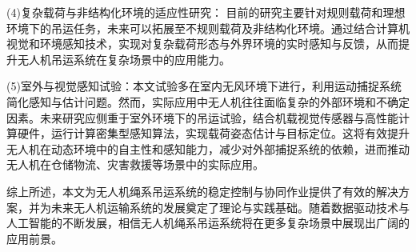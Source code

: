 \documentclass[lang=chs, degree=master, blindreview=true, winfonts=true]{yanputhesis}
\begin{document}
(4)复杂载荷与非结构化环境的适应性研究：
目前的研究主要针对规则载荷和理想环境下的吊运任务，未来可以拓展至不规则载荷及非结构化环境。通过结合计算机视觉和环境感知技术，实现对复杂载荷形态与外界环境的实时感知与反馈，从而提升无人机吊运系统在复杂场景中的应用能力。

(5)室外与视觉感知试验：本文试验多在室内无风环境下进行，利用运动捕捉系统简化感知与估计问题。然而，实际应用中无人机往往面临复杂的外部环境和不确定因素。未来研究应侧重于室外环境下的吊运试验，结合机载视觉传感器与高性能计算硬件，运行计算密集型感知算法，实现载荷姿态估计与目标定位。这将有效提升无人机在动态环境中的自主性和感知能力，减少对外部捕捉系统的依赖，进而推动无人机在仓储物流、灾害救援等场景中的实际应用。

综上所述，本文为无人机绳系吊运系统的稳定控制与协同作业提供了有效的解决方案，并为未来无人机运输系统的发展奠定了理论与实践基础。随着数据驱动技术与人工智能的不断发展，相信无人机绳系吊运系统将在更多复杂场景中展现出广阔的应用前景。





\backmatter                                                 %
%
\end{document}
